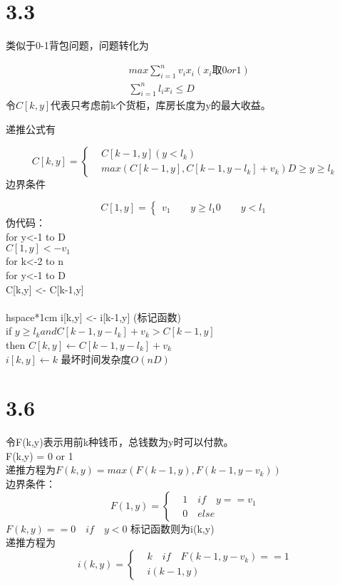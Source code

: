 \documentclass[a4paper]{article}
\begin{document}
\section*{3.3}
类似于0-1背包问题，问题转化为

\begin{align*}
  & max \sum_{i=1}^{n}v_i x_i (x_i 取 0 or 1) \\
  & \sum_{i=1}^{n}l_i x_i \le D
\end{align*}
令$C[k,y]$代表只考虑前k个货柜，库房长度为y的最大收益。

递推公式有

$$
C[k,y]=\left\{
\begin{aligned}
& C[k-1,y] (y<l_k) \\
& max(C[k-1,y],C[k-1,y-l_k]+v_k) D\ge y \ge l_k
\end{aligned}
\right.
$$
边界条件

$$
C[1,y] = \left \{
\begin{aligned}
v_1 \qquad y \ge l_1
0 \qquad  y < l_1
\end{aligned}
\right.
$$
伪代码：\\
for y<-1 to D \\
\hspace*{0.5cm}
	$C[1,y] <- v_1$ \\
for k<-2 to n \\
\hspace*{0.5cm}
for  y<-1 to D \\
\hspace*{1cm}
C[k,y] <- C[k-1,y] \\
\\hspace*{1cm}
i[k,y] <- i[k-1,y] (标记函数)\\
\hspace*{1cm}
if $y \ge l_k and C[k-1,y-l_k]+v_k >  C[k-1,y]$ \\
\hspace*{1cm}
then $C[k,y] \leftarrow C[k-1,y-l_k]+v_k$ \\
\hspace*{1.5cm}
$i[k,y]\leftarrow k$
最坏时间发杂度$O(nD)$

\section*{3.6}
令F(k,y)表示用前k种钱币，总钱数为y时可以付款。\\
F(k,y) = 0 or 1\\
递推方程为$F(k,y)=max(F(k-1,y),F(k-1,y-v_k))$ \\
边界条件：\\
$$
F(1,y) = \left\{
\begin{aligned}
& 1 \quad if \quad y==v_1 \\
& 0 \quad else
\end{aligned}
\right.
$$
$F(k,y) == 0 \quad if \quad y < 0$
标记函数则为i(k,y) \\
递推方程为\\
$$
i(k,y) =\left\{
\begin{aligned}
& k \quad if \quad F(k-1,y-v_k) == 1 \\
& i(k-1,y)  
\end{aligned}
\right.
$$
\end{document}

